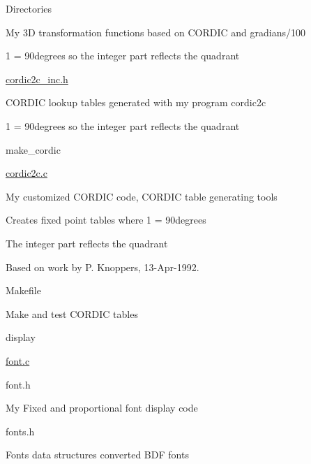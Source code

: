 \begin{DoxyParagraph}{Directories}
\begin{DoxyItemize}
\begin{DoxyItemize}
\begin{DoxyItemize}
\item My 3\-D transformation functions based on C\-O\-R\-D\-I\-C and gradians/100
\item 1 = 90degrees so the integer part reflects the quadrant
\end{DoxyItemize}
\item \hyperlink{cordic2c__inc_8h}{cordic2c\-\_\-inc.\-h}
\begin{DoxyItemize}
\item C\-O\-R\-D\-I\-C lookup tables generated with my program cordic2c
\item 1 = 90degrees so the integer part reflects the quadrant
\end{DoxyItemize}
\item make\-\_\-cordic
\begin{DoxyItemize}
\item \hyperlink{cordic2c_8c}{cordic2c.\-c}
\begin{DoxyItemize}
\item My customized C\-O\-R\-D\-I\-C code, C\-O\-R\-D\-I\-C table generating tools
\item Creates fixed point tables where 1 = 90degrees
\begin{DoxyItemize}
\item The integer part reflects the quadrant
\end{DoxyItemize}
\item Based on work by P. Knoppers, 13-\/\-Apr-\/1992.
\end{DoxyItemize}
\item Makefile
\begin{DoxyItemize}
\item Make and test C\-O\-R\-D\-I\-C tables
\end{DoxyItemize}
\end{DoxyItemize}
\end{DoxyItemize}
\item display
\begin{DoxyItemize}
\item \hyperlink{font_8c}{font.\-c}
\item font.\-h
\begin{DoxyItemize}
\item My Fixed and proportional font display code
\end{DoxyItemize}
\item fonts.\-h
\begin{DoxyItemize}
\item Fonts data structures converted B\-D\-F fonts
\end{DoxyItemize}

\end{DoxyItemize}
\end{DoxyItemize}
\end{DoxyParagraph}
